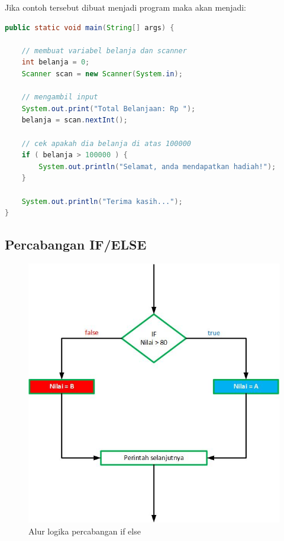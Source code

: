 Jika contoh tersebut dibuat menjadi program maka akan menjadi:
\begin{lstlisting}[language=Java]
public static void main(String[] args) {

    // membuat variabel belanja dan scanner
    int belanja = 0;
    Scanner scan = new Scanner(System.in);

    // mengambil input
    System.out.print("Total Belanjaan: Rp ");
    belanja = scan.nextInt();

    // cek apakah dia belanja di atas 100000
    if ( belanja > 100000 ) {
        System.out.println("Selamat, anda mendapatkan hadiah!");
    }

    System.out.println("Terima kasih...");
}

\end{lstlisting}

\subsection{Percabangan IF/ELSE}
\begin{figure}[h!]
    \centering
    \includegraphics[scale=0.4]{pictures/flowmap_if_else.jpg}
    \caption{Alur logika percabangan if else}
    \label{}
\end{figure}

